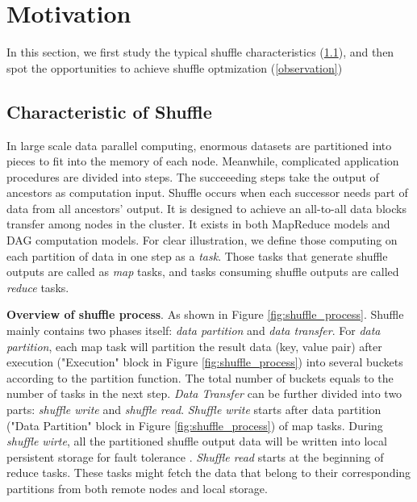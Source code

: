 \section{Motivation}

In this section, we first study the typical shuffle characteristics (\ref{shuffle pattern}), and then spot the opportunities to achieve shuffle optmization (\ref{observation})
\subsection{Characteristic of Shuffle} \label{shuffle pattern}

In large scale data parallel computing, enormous datasets are partitioned into pieces to fit into the memory of each node.
Meanwhile, complicated application procedures are divided into steps. The succeeeding steps take the output of ancestors as computation input. Shuffle occurs when each successor needs 
part of data from all ancestors' output. It is designed to achieve an all-to-all data blocks transfer among nodes in the cluster. It exists in both MapReduce models and DAG computation models.
For clear illustration, we define those computing on each partition of data in one step as a \textit{task}. 
Those tasks that generate shuffle outputs are called as \textit{map} tasks, and tasks consuming shuffle outputs are called \textit{reduce} tasks.

\textbf{Overview of shuffle process}. As shown in Figure \ref{fig:shuffle_process}. Shuffle mainly contains two phases itself: \textit{data partition} and \textit{data transfer}. For \textit{data partition}, each map task will partition the result data (key, value pair) after execution ("Execution" block in Figure \ref{fig:shuffle_process}) into several buckets according to the partition function.
The total number of buckets equals to the number of tasks in the next step. 
\textit{Data Transfer} can be further divided into two parts: \textit{shuffle write} and \textit{shuffle read}. \textit{Shuffle write} starts after data partition ("Data Partition" block in Figure \ref{fig:shuffle_process}) of map tasks. 
During \textit{shuffle wirte}, all the partitioned shuffle output data will be written into local persistent storage for fault tolerance \cite{mapreduce, spark}.
\textit{Shuffle read} starts at the beginning of reduce tasks. These tasks might fetch the data that belong to their corresponding partitions from both remote nodes and local storage.

